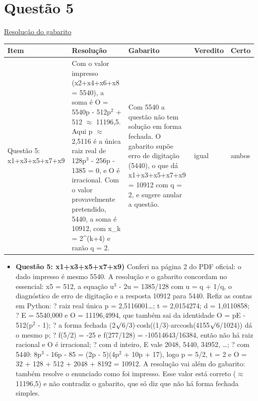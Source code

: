 \documentclass{article}%
\begin{document}
\section*{Questão 5}%
\href{https://poliedroresolve.sistemapoliedro.com.br/vestibulares/ime/2027/ime-2-fase-dia-1-26-10-2026-2-fase-dia-1/dissertativa-5-matematica-2-fase-dia-1-ime-2027}{Resolução do gabarito}\par\smallskip%
\begin{longtable}{@{}p{} p{} p{} p{} p{}@{}}\toprule Item & Resolução & Gabarito & Veredito & Certo \\ \midrule
Questão 5: x1+x3+x5+x7+x9 & Com o valor impresso (x2+x4+x6+x8 = 5540), a soma é O = 5540p - 512p$^2$ + 512 $\approx$ 11196,5. Aqui p $\approx$ 2,5116 é a única raiz real de 128p$^3$ - 256p - 1385 = 0, e O é irracional. Com o valor provavelmente pretendido, 5440, a soma é 10912, com x\_k = 2\^{}(k+4) e razão q = 2. & Com 5540 a questão não tem solução em forma fechada. O gabarito supõe erro de digitação (5440), o que dá x1+x3+x5+x7+x9 = 10912 com q = 2, e sugere anular a questão. & igual & ambos \\
\bottomrule\end{longtable}%
\begin{itemize}%
\item%
\textbf{Questão 5: x1+x3+x5+x7+x9)} Conferi na página 2 do PDF oficial: o dado impresso é mesmo 5540. A resolução e o gabarito concordam no essencial: x5 = 512, a equação u$^3$ - 2u = 1385/128 com u = q + 1/q, o diagnóstico de erro de digitação e a resposta 10912 para 5440. Refiz as contas em Python:\newline%
? raiz real única p = 2,5116001\ldots{}; t = 2,0154274; d = 1,0110858;\newline%
? E = 5540,000 e O = 11196,4994, que também sai da identidade O = pE - 512(p$^2$ - 1);\newline%
? a forma fechada (2$\surd$6/3)$\cdot$cosh((1/3)$\cdot$arccosh(4155$\surd$6/1024)) dá o mesmo p;\newline%
? f(5/2) = -25 e f(277/128) = -10514643/16384, então não há raiz racional e O é irracional;\newline%
? com d inteiro, E vale 2048, 5440, 34952, \ldots{};\newline%
? com 5440: 8p$^3$ - 16p - 85 = (2p - 5)(4p$^2$ + 10p + 17), logo p = 5/2, t = 2 e O = 32 + 128 + 512 + 2048 + 8192 = 10912.\newline%
A resolução vai além do gabarito: também resolve o enunciado como foi impresso. Esse valor está correto ($\approx$ 11196,5) e não contradiz o gabarito, que só diz que não há forma fechada simples.%
\end{itemize}%
\end{document}
